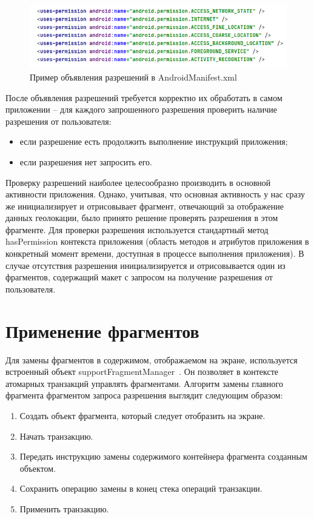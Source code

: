 \begin{figure}[H]
	\centering
	\includegraphics[width=\textwidth]{flesh/somefunc/manifest_permissions.png}
	\caption{\label{fig:manifest_permissions}Пример объявления разрешений в AndroidManifest.xml}
\end{figure}


После объявления разрешений требуется корректно их обработать в самом приложении – для каждого запрошенного разрешения проверить наличие разрешения от пользователя:
\begin{itemize}
	\item если разрешение есть \textendash\space продолжить выполнение инструкций приложения;
	\item если разрешения нет \textendash\space запросить его.
\end{itemize}


Проверку разрешений наиболее целесообразно производить в основной активности приложения. Однако, учитывая, что основная активность у нас сразу же инициализирует и отрисовывает фрагмент, отвечающий за отображение данных геолокации, было принято решение проверять разрешения в этом фрагменте.
Для проверки разрешения используется стандартный метод hasPermission контекста приложения (область методов и атрибутов приложения в конкретный момент времени, доступная в процессе выполнения приложения). 
В случае отсутствия разрешения инициализируется и отрисовывается один из фрагментов, содержащий макет с запросом на получение разрешения от пользователя. 

\section{Применение фрагментов}
Для замены фрагментов в содержимом, отображаемом на экране, используется встроенный объект supportFragmentManager~\autocite{android_fragment_manager}. Он позволяет в контексте атомарных транзакций управлять фрагментами. Алгоритм замены главного фрагмента фрагментом запроса разрешения выглядит следующим образом:
\begin{enumerate}
	\item Создать объект фрагмента, который следует отобразить на экране.
	\item Начать транзакцию.
	\item Передать инструкцию замены содержимого контейнера фрагмента созданным объектом.
	\item Сохранить операцию замены в конец стека операций транзакции.
	\item Применить транзакцию.
\end{enumerate}


